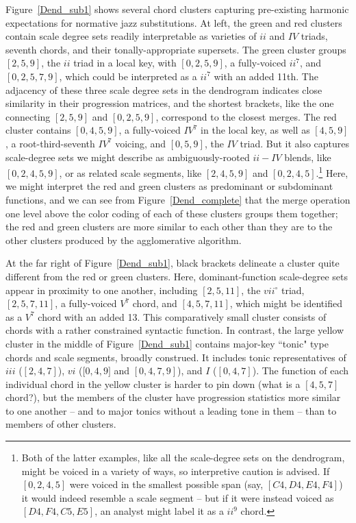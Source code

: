 
Figure~\ref{Dend_sub1} shows several chord clusters capturing pre-existing harmonic expectations for normative jazz substitutions.  At left, the green and red clusters contain scale degree sets readily interpretable as varieties of $ii$ and $IV$ triads, seventh chords, and their tonally-appropriate supersets.  The green cluster groups $[2,5,9]$, the $ii$ triad in a local key, with $[0,2,5,9]$, a fully-voiced $ii^7$, and $[0,2,5,7,9]$, which could be interpreted as a $ii^{7}$ with an added 11th.  The adjacency of these three scale degree sets in the dendrogram indicates close similarity in their progression matrices, and the shortest brackets, like the one connecting $[2,5,9]$ and $[0,2,5,9]$, correspond to the closest merges.  The red cluster contains $[0,4,5,9]$, a fully-voiced $IV^7$ in the local key, as well as $[4,5,9]$, a root-third-seventh $IV^7$ voicing, and $[0,5,9]$, the $IV$ triad.  But it also captures scale-degree sets we might describe as ambiguously-rooted $ii-IV$ blends, like $[0,2,4,5,9]$, or as related scale segments, like $[2,4,5,9]$ and $[0,2,4,5]$.\footnote{Both of the latter examples, like all the scale-degree sets on the dendrogram, might be voiced in a variety of ways, so interpretive caution is advised.  If $[0,2,4,5]$ were voiced in the smallest possible span (say, $[C4,D4,E4,F4]$) it would indeed resemble a scale segment -- but if it were instead voiced as $[D4,F4,C5,E5]$, an analyst might label it as a $ii^9$ chord.}   Here, we might interpret the red and green clusters as predominant or subdominant functions, and we can see from Figure~\ref{Dend_complete} that the merge operation one level above the color coding of each of these clusters groups them together; the red and green clusters are more similar to each other than they are to the other clusters produced by the agglomerative algorithm.

At the far right of Figure~\ref{Dend_sub1}, black brackets delineate a cluster quite different from the red or green clusters.  Here, dominant-function scale-degree sets appear in proximity to one another, including $[2,5,11]$, the $vii^{\circ}$ triad, $[2,5,7,11]$, a fully-voiced $V^7$ chord, and $[4,5,7,11]$, which might be identified as a $V^7$ chord with an added 13.  This comparatively small cluster consists of chords with a rather constrained syntactic function.  In contrast, the large yellow cluster in the middle of Figure~\ref{Dend_sub1} contains major-key ``tonic" type chords and scale segments, broadly construed.  It includes tonic representatives of $iii$ ($[2,4,7]$), $vi$ ([$0,4,9]$ and $[0,4,7,9]$), and $I$ ($[0,4,7]$).  The function of each individual chord in the yellow cluster is harder to pin down (what is a $[4,5,7]$ chord?), but the members of the cluster have progression statistics more similar to one another -- and to major tonics without a leading tone in them -- than to members of other clusters.

